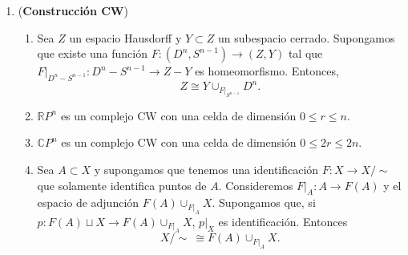 \documentclass[11pt,a4paper]{article}
\theoremstyle{plain}
\theoremstyle{definition}
\theoremstyle{remark}
\newcommand{\RR}{\mathbb R}
\newcommand{\CC}{\mathbb C}
\DeclareMathOperator{\im}{im}
\begin{document}
\begin{enumerate}[label=\arabic*.,leftmargin=*]
\begin{enumerate}[label=\alph*)]
$c\in S_2(\Delta_1)$ tal que $\partial_2(c)=\mathrm{id}_{\Delta_1}+\iota$.
Se sigue que
\[
\sigma+\sigma_\#(\iota)=\sigma_\#(\mathrm{id}_{\Delta_1}+\iota)=\sigma_\#\partial_2(c)=\partial_2\sigma_\#(c)\in B_1(X)
\]
y $[\sigma+\sigma_\#(\iota)]=0$ en $H_1(X)$.
\item Sea $\overline c:\Delta_2\to X$ dado por $\overline c(t_0,t_1)=z(t_0)$.
Tenemos,
\[
\partial_2(\overline c)=\overline c\circ F_2^0-\overline c\circ F_2^1+\overline c\circ F_2^2
=\overline c(1-t,t)-\overline c(0,t)+\overline c(t,0)
=z(1-t)-z(0)+z(t).
\]
De esto último,
$\partial_2(\overline c)=\overline z-c_{z_0}+z$. Sea $\hat c:\Delta_2\to X$
la función constante con valor $z_0$. Por lo tanto, tomando $c=\overline c+\hat c$,
se sigue $\partial_2(c)=\overline z+z$.
\item Sea $X=S^1$, $B=\im\beta_1$ y $A=\im\beta_2\cup\cdots\cup\im\beta_n$.
Tenemos que $A\cap B=\{x_1,x_2\}$. Empleando la sucesión de
Mayer--Vietoris,
\[
0=\tilde H_1(A)\oplus\tilde H_1(B)\to H_1(S^1)\xrightarrow{\Delta_1}\tilde H_0(\{x_1,x_2\})\to0
\]
Tomemos $[\beta_1]\in H_1(B,A\cap B)$. Basta ver que
$[\beta_1+\cdots+\beta_n]=[\beta_1]\in H_1(S^1,A)$. Pero,
\[
\beta_1+\cdots+\beta_n-\beta_1=\beta_2+\cdots+\beta_n\in B_1(S^1,A)
\]
por lo que
\[
\Delta_1[\beta_1+\cdots+\beta_n]=\hat\partial_1[\beta_1]=\partial_1(\beta_1)=x_2-x_1
\]
que es un generador pues $\epsilon(x_2-x_1)=1-1=0$.
\end{enumerate}

\item (\textbf{Construcción CW})
\begin{enumerate}[label=\alph*)]
\item Sea $Z$ un espacio Hausdorff y $Y\subset Z$ un subespacio cerrado.
Supongamos que existe una función $F:(D^n,S^{n-1})\to(Z,Y)$ tal que
$F|_{D^n-S^{n-1}}:D^n-S^{n-1}\to Z-Y$ es homeomorfismo. Entonces,
\[
Z\cong Y\cup_{F|_{S^{n-1}}}D^n.
\]
\item $\RR P^n$ es un complejo CW con una celda de dimensión $0\le r\le n$.
\item $\CC P^n$ es un complejo CW con una celda de dimensión $0\le2r\le2n$.
\item Sea $A\subset X$ y supongamos que tenemos una identificación
$F:X\to X/\!\sim$ que solamente identifica puntos de $A$. Consideremos
$F|_A:A\to F(A)$ y el espacio de adjunción $F(A)\cup_{F|_A}X$. Supongamos
que, si $p:F(A)\sqcup X\to F(A)\cup_{F|_A}X$, $p|_X$ es identificación.
Entonces
\[
X/\!\sim\ \cong F(A)\cup_{F|_A}X.
\]
\end{enumerate}


\end{enumerate}
\end{document}
